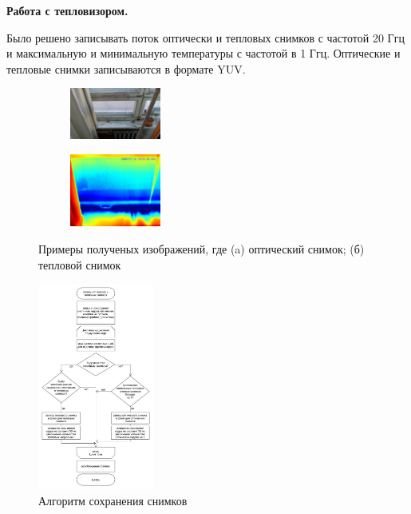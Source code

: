 \documentclass[t]{beamer}
\begin{document}
	\begin{frame}
		\textbf{Работа с тепловизором.}
		
		Было решено записывать поток оптически и тепловых снимков с частотой 20 Ггц и максимальную и минимальную температуры с частотой в 1 Ггц. Оптические и тепловые снимки записываются в формате YUV.
		\begin{figure}[ht!]
			\begin{subfigure}{.45\textwidth}
				\centering
				\includegraphics[width = 3cm]{image/chapter_2/opt_example}
				\caption{}
			\end{subfigure}
			\begin{subfigure}{.45\textwidth}
				\centering
				\includegraphics[width = 3cm]{image/chapter_2/tep_example}
				\caption{}
			\end{subfigure}
			\centering
			\caption{Примеры полученых изображений, где (a) оптический снимок; (б) тепловой снимок}
			\label{fig:Examples}
		\end{figure}
	\end{frame}

	\begin{frame}
		\begin{figure}[h!]
			\centering
			\includegraphics[width = 0.34\textwidth]{image/chapter_2/loaddata}	
			\caption{Алгоритм сохранения снимков}
			\label{fig:loaddata}
		\end{figure}
	\end{frame}
\end{document}
